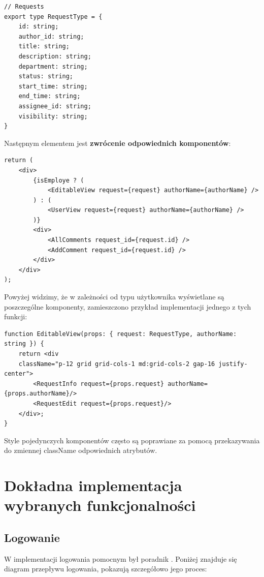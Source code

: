\begin{verbatim}
// Requests
export type RequestType = {
    id: string;
    author_id: string;
    title: string;
    description: string;
    department: string;
    status: string;
    start_time: string;
    end_time: string;
    assignee_id: string;
    visibility: string;
}
\end{verbatim}
Następnym elementem jest \textbf{zwrócenie odpowiednich komponentów}:
\begin{verbatim}
return (
    <div>
        {isEmploye ? (
            <EditableView request={request} authorName={authorName} />
        ) : (
            <UserView request={request} authorName={authorName} />
        )}
        <div>
            <AllComments request_id={request.id} />
            <AddComment request_id={request.id} />
        </div>
    </div>
);
\end{verbatim}
Powyżej widzimy, że w zależności od typu użytkownika wyświetlane są poszczególne komponenty, zamieszczono przykład implementacji jednego z tych funkcji:
\begin{verbatim}
function EditableView(props: { request: RequestType, authorName: string }) {
    return <div 
    className="p-12 grid grid-cols-1 md:grid-cols-2 gap-16 justify-center">
        <RequestInfo request={props.request} authorName={props.authorName}/>
        <RequestEdit request={props.request}/>
    </div>;
}
\end{verbatim}

Style pojedynczych komponentów często są poprawiane za pomocą przekazywania do zmiennej className odpowiednich atrybutów.

\newpage
\section{Dokładna implementacja wybranych funkcjonalności}
\subsection{Logowanie}
W implementacji logowania pomocnym był poradnik \cite{FastapiAuthLearn}.
Poniżej znajduje się diagram przepływu logowania, pokazują szczegółowo jego proces:

